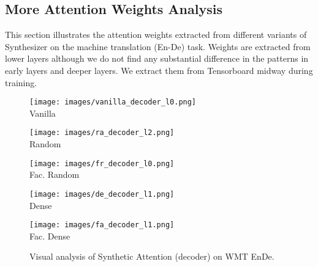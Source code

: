\documentclass{article} \usepackage{iclr2021_conference,times}
\begin{document}
\subsection{More Attention Weights Analysis}
This section illustrates the attention weights extracted from different variants of Synthesizer on the machine translation (En-De) task. Weights are extracted from lower layers although we do not find any substantial difference in the patterns in early layers and deeper layers. We extract them from Tensorboard midway during training.
\begin{figure}[H]
\begin{minipage}{0.18\linewidth}
  \centering
     \texttt{[image: images/vanilla\_decoder\_l0.png]}
    \\ {Vanilla}
    \label{fig:sortiter}
\end{minipage}\hfill
\begin{minipage}{0.18\linewidth}
  \centering
     \texttt{[image: images/ra\_decoder\_l2.png]}
    \\ {Random}
    \label{fig:sortiter}
\end{minipage}\hfill
\begin{minipage}{0.18\linewidth}
  \centering
    \texttt{[image: images/fr\_decoder\_l0.png]}
    \\ {Fac. Random}
    \label{fig:temperature}
\end{minipage}\hfill
\begin{minipage}{0.18\linewidth}
  \centering
     \texttt{[image: images/de\_decoder\_l1.png]}
    \\ {Dense}
    \label{fig:sortiter}
\end{minipage}
\begin{minipage}{0.18\linewidth}
  \centering
     \texttt{[image: images/fa\_decoder\_l1.png]}
    \\ {Fac. Dense}
    \label{fig:sortiter}
\end{minipage}\hfill 
\label{fig:analysis}
\caption{Visual analysis of Synthetic Attention (decoder) on WMT EnDe.}
\end{figure}
\end{document}
